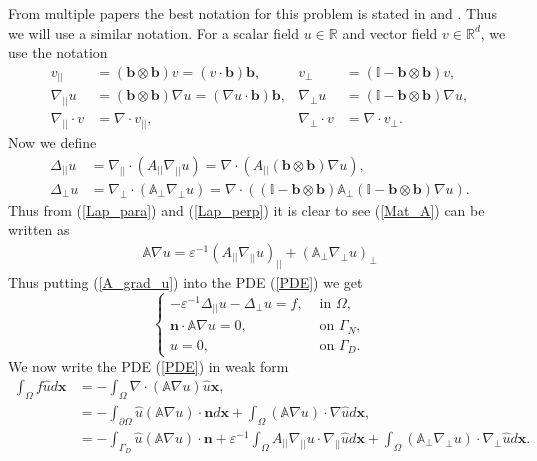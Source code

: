 \documentclass[12pt]{ociamthesis}
\begin{document}
From multiple papers the best notation for this problem is stated in \cite{DN} and \cite{AP}. Thus we will use a similar notation. For a scalar field $u\in\mathbb{R}$ and vector field $v \in \mathbb{R}^d$, we use the notation
\begin{align}
v_{||} &=(\mathbf{b} \otimes \mathbf{b})v = (v \cdot \mathbf{b})\mathbf{b}
, & v_{\perp} &= (\mathbb{I}-\mathbf{b} \otimes \mathbf{b})v,\\
\nabla_{||}u &= (\mathbf{b} \otimes \mathbf{b}) \nabla u = (\nabla u \cdot \mathbf{b})\mathbf{b},
& \nabla_{\perp} u &= (\mathbb{I}-\mathbf{b} \otimes \mathbf{b}) \nabla u,\\
\nabla_{||} \cdot v &= \nabla \cdot v_{||},
& \nabla_{\perp} \cdot v &= \nabla \cdot v_{\perp}.
\end{align}
Now we define 
\begin{align} \label{Lap_para}
\Delta_{||}u &= \nabla_{||}\cdot(A_{||}\nabla_{||}u)  =
\nabla \cdot(A_{||} (\mathbf{b} \otimes \mathbf{b}) \nabla u),\\ \label{Lap_perp}
\Delta_{\perp}u  &= \nabla_{\perp}\cdot(\mathbb{A}_{\perp}\nabla_{\perp}u)  = 
\nabla \cdot((\mathbb{I}-\mathbf{b} \otimes \mathbf{b})\mathbb{A}_{\perp}(\mathbb{I}-\mathbf{b} \otimes \mathbf{b})\nabla u).
\end{align}
Thus from (\ref{Lap_para}) and (\ref{Lap_perp}) it is clear to see (\ref{Mat_A}) can be written as
\begin{align} \label{A_grad_u}
\mathbb{A} \nabla u = 
\varepsilon^{-1}(A_{||}\nabla_{||} u)_{||} + 
(\mathbb{A}_{\perp}\nabla_{\perp}u)_{\perp} 
\end{align}
Thus putting (\ref{A_grad_u}) into the PDE (\ref{PDE}) we get
\begin{equation}
\begin{cases}
-\varepsilon^{-1} \Delta_{||}u - \Delta_{\perp}u = f, & \text{ in }\Omega,\\
\mathbf{n}\cdot \mathbb{A}\nabla u = 0, & \text{ on }\Gamma_N, \\
u = 0, & \text{  on }\Gamma_D.
\end{cases}
\end{equation}
We now write the PDE (\ref{PDE}) in weak form
\begin{align}
\int_{\Omega}f\hat{u}d\mathbf{x} &= - \int_{\Omega} \nabla \cdot (\mathbb{A} \nabla u) \hat{u} \mathbf{x},\\ \label{WF_ND}
&= - \int_{\partial \Omega} \hat{u} (\mathbb{A} \nabla u) \cdot \mathbf{n} d\mathbf{x}
+ \int_{\Omega}(\mathbb{A}\nabla u)\cdot \nabla \hat{u} d \mathbf{x},\\ \label{Intro_Final_w}
&= - \int_{\Gamma_D} \hat{u} (\mathbb{A}\nabla u) \cdot \mathbf{n} + 
\varepsilon^{-1}\int_{\Omega} A_{||} \nabla_{||}u \cdot \nabla_{||}\hat{u} d\mathbf{x} +
\int_{\Omega}(\mathbb{A}_{\perp} \nabla_{\perp} u )\cdot \nabla_{\perp} \hat{u} d\mathbf{x}.
\end{align}
\end{document}
